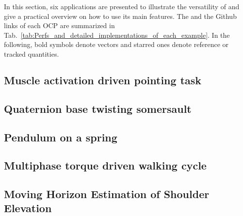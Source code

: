 In this section, six applications are presented to illustrate the versatility of \bioptim and give a practical overview on how to use its main features.
The  and the Github links of each OCP are summarized in Tab.~\ref{tab:Perfs_and_detailed_implementations_of_each_example}.
In the following, bold symbols denote vectors and starred ones denote reference or tracked quantities.


\subsection{Muscle activation driven pointing task}


\subsection{Quaternion base twisting somersault}


\subsection{Pendulum on a spring}


\subsection{Multiphase torque driven walking cycle}


\subsection{Moving Horizon Estimation of Shoulder Elevation}


